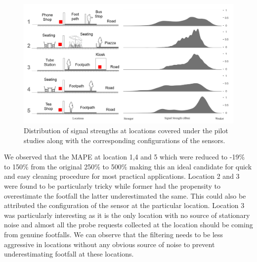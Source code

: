 \begin{figure}
  \includegraphics{images/processing-pilot-signal.png}
  \caption{Distribution of signal strengths at locations covered under the pilot studies along with the corresponding configurations of the sensors.}
  \label{figure:processing:pilot:signal}
\end{figure}

We observed that the MAPE at location 1,4 and 5 which were reduced to -19\% to 150\% from the original 250\% to 500\% making this an ideal candidate for quick and easy cleaning procedure for most practical applications.
Location 2 and 3 were found to be particularly tricky while former had the propensity to overestimate the footfall the latter underestimated the same.
This could also be attributed the configuration of the sensor at the particular location.
Location 3 was particularly interesting as it is the only location with no source of stationary noise and almost all the probe requests collected at the location should be coming from genuine footfalls.
We can observe that the filtering needs to be less aggressive in locations without any obvious source of noise to prevent underestimating footfall at these locations.


